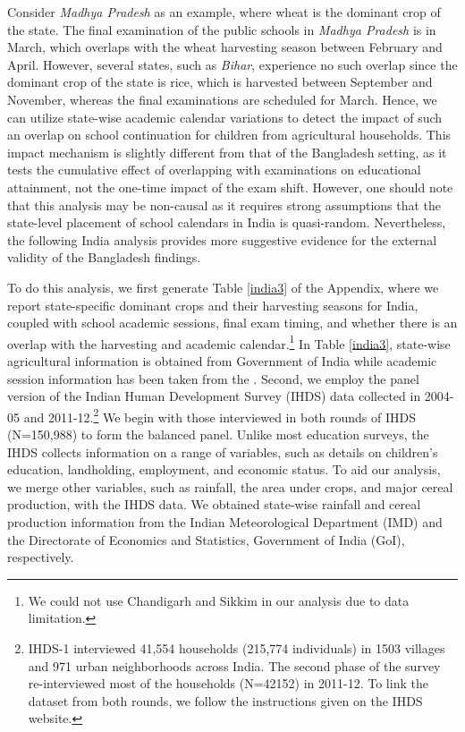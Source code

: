 \documentclass[12pt,letterpaper]{article}\usepackage[margin=1in]{geometry}
\newcommand{\0}{\ensuremath{\mbox{\boldmath $0$}}}
\begin{document}
Consider \textit{Madhya Pradesh} as an example, where wheat is the dominant crop of the state. The final examination of the public schools in \textit{Madhya Pradesh} is in March, which overlaps with the wheat harvesting season between February and April. However, several states, such as \textit{Bihar}, experience no such overlap since the dominant crop of the state is rice, which is harvested between September and November, whereas the final examinations are scheduled for March. Hence, we can utilize state-wise academic calendar variations to detect the impact of such an overlap on school continuation for children from agricultural households. This impact mechanism is slightly different from that of the Bangladesh setting, as it tests the cumulative effect of overlapping with examinations on educational attainment, not the one-time impact of the exam shift. However, one should note that this analysis may be non-causal as it requires strong assumptions that the state-level placement of school calendars in India is quasi-random. Nevertheless, the following India analysis provides more suggestive evidence for the external validity of the Bangladesh findings. 

To do this analysis, we first generate Table \ref{india3} of the Appendix, where we report state-specific dominant crops and their harvesting seasons for India, coupled with school academic sessions, final exam timing, and whether there is an overlap with the harvesting and academic calendar.\footnote{We could not use Chandigarh and Sikkim in our analysis due to data limitation.} In Table \ref{india3}, state-wise agricultural information is obtained from Government of India \citep{doac2017agricultural} while academic session information has been taken from the \cite{doac2011education}. Second, we employ the panel version of the Indian Human Development Survey (IHDS) data collected in 2004-05 and 2011-12.\footnote{IHDS-1 interviewed 41,554 households (215,774 individuals) in 1503 villages and 971 urban neighborhoods across India. The second phase of the survey re-interviewed most of the households (N=42152) in 2011-12. To link the dataset from both rounds, we follow the instructions given on the IHDS website.} We begin with those interviewed in both rounds of IHDS (N=150,988) to form the balanced panel. Unlike most education surveys, the IHDS collects information on a range of variables, such as details on children's education, landholding, employment, and economic status. To aid our analysis, we merge other variables, such as rainfall, the area under crops, and major cereal production, with the IHDS data. We obtained state-wise rainfall and cereal production information from the Indian Meteorological Department (IMD) and the Directorate of Economics and Statistics, Government of India (GoI), respectively.
\end{document}
